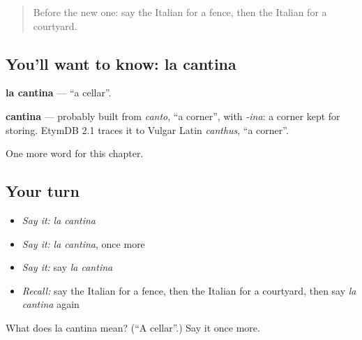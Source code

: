 \label{lesson:IT-C255-cantina}



\begin{quote}
Before the new one: say the Italian for a fence, then the Italian for a courtyard.
\end{quote}

\subsection*{You'll want to know: la cantina}
\textbf{la cantina} — \textquotedblleft{}a cellar\textquotedblright{}.

\begin{cousinweb}
\textbf{cantina} — probably built from \emph{canto}, \textquotedblleft{}a corner\textquotedblright{}, with \emph{-ina}: a corner kept for storing. EtymDB 2.1 traces it to Vulgar Latin \emph{canthus}, \textquotedblleft{}a corner\textquotedblright{}.
\end{cousinweb}

\begin{grammarlens}[title={What you've built}]
One more word for this chapter.
\end{grammarlens}

\subsection*{Your turn}
\begin{itemize}
\raggedright
  \item \emph{Say it:} \emph{la cantina}
  \item \emph{Say it:} \emph{la cantina}, once more
  \item \emph{Say it:} say \emph{la cantina}
  \item \emph{Recall:} say the Italian for a fence, then the Italian for a courtyard, then say \emph{la cantina} again
\end{itemize}

\begin{tcolorbox}[breakable,colback=teal!4,colframe=teal!35!black,title={Before you move on}]
What does la cantina mean? (\textquotedblleft{}A cellar\textquotedblright{}.) Say it once more.
\end{tcolorbox}
